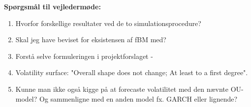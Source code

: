 \newpage
\textbf{Spørgsmål til vejledermøde:}
\begin{enumerate}
    \item Hvorfor forskellige resultater ved de to simulationsprocedure?
    \item Skal jeg have beviset for eksistensen af fBM med? 
    \item Forstå selve formuleringen i projektforslaget -
    \item Volatility surface: "Overall shape does not change; At least to a first degree".
    \item Kunne man ikke også kigge på at forecaste volatilitet med den nævnte OU-model? Og sammenligne med en anden model fx. GARCH eller lignende? 
\end{enumerate}